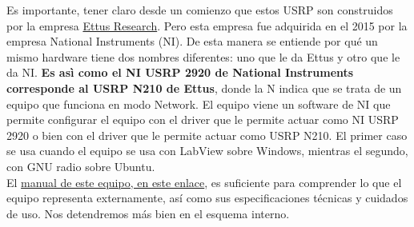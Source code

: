 Es importante, tener claro desde un comienzo que estos USRP son construidos por la empresa \underline{Ettus Research}. Pero esta empresa fue adquirida en el 2015 por la empresa National Instruments (NI). De esta manera se entiende por qué un mismo hardware tiene dos nombres diferentes: uno que le da Ettus y otro que le da NI. \textbf{Es asì como el NI USRP 2920 de National Instruments corresponde al USRP N210 de Ettus}, donde la N indica que se trata de un equipo que funciona en modo Network. El equipo viene un software de NI que permite configurar el equipo con el driver que le permite actuar como NI USRP 2920 o bien con el driver que le permite actuar como USRP N210. El primer caso se usa cuando el equipo se usa con LabView sobre Windows, mientras el segundo, con GNU radio sobre Ubuntu. \\

El	\textcolor{red}{\href{http://www.ni.com/pdf/manuals/375839a.pdf}{manual de este equipo, en este enlace}}, es suficiente para comprender lo que el equipo representa externamente, así como sus especificaciones técnicas y cuidados de uso. Nos detendremos más bien en el esquema interno.\\

